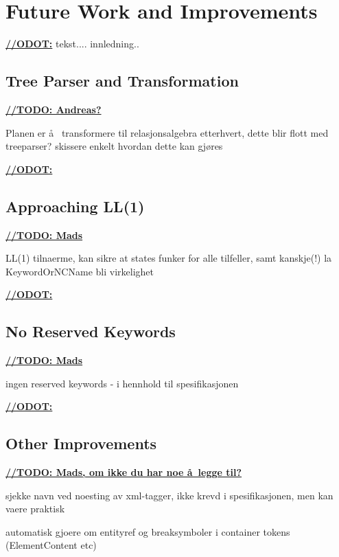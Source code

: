 \chapter{Future Work and Improvements}
\label{sect:summary:future_work}
\underline{\textbf{\LARGE //ODOT:}} tekst.... innledning..




\section{Tree Parser and Transformation}
\underline{\textbf{\LARGE //TODO: Andreas?}}

Planen er \aa~ transformere til relasjonsalgebra etterhvert, dette blir flott med treeparser? skissere enkelt hvordan dette kan gj\o res

\underline{\textbf{\LARGE //ODOT:}}

\section{Approaching LL(1)}

\underline{\textbf{\LARGE //TODO: Mads}}

LL(1) tilnaerme, kan sikre at states funker for alle tilfeller, samt kanskje(!) la KeywordOrNCName bli virkelighet

\underline{\textbf{\LARGE //ODOT:}}

\section{No Reserved Keywords}

\underline{\textbf{\LARGE //TODO: Mads}}

ingen reserved keywords - i hennhold til spesifikasjonen

\underline{\textbf{\LARGE //ODOT:}}

\section{Other Improvements}

\underline{\textbf{\LARGE //TODO: Mads, om ikke du har noe \aa~legge til?}}

sjekke navn ved noesting av xml-tagger, ikke krevd i spesifikasjonen, men kan vaere praktisk

automatisk gjoere om entityref og breaksymboler i container tokens (ElementContent etc)


